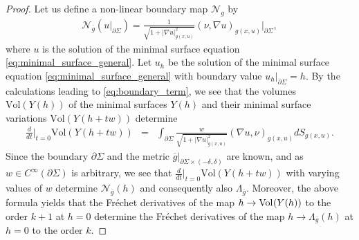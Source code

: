 \documentclass[12pt]{amsart}
\def\p{\partial}
\theoremstyle{definition}
\theoremstyle{remark}
\newcommand{\abs}[1]{\lvert #1 \rvert}
\newcommand{\s}{\hspace{0.5pt}}
\begin{document}
\begin{proof}

Let us define a non-linear boundary map $\mathcal{N}_g$ by
\begin{eqnarray*}
\mathcal{N}_{\overline g} (u|_{\p \Sigma})= \frac 1{\sqrt{1+\abs{\nabla u}^2_{g(x,u)}}}
 (\nu, \nabla u)_{g(x,u)}\bigg|_{\p \Sigma},
\end{eqnarray*}
where $u$ is the solution of the minimal surface equation \eqref{eq:minimal_surface_general}. Let $u_h$ be the solution of the minimal surface equation \eqref{eq:minimal_surface_general} with
boundary value  $u_h|_{\p\Sigma}=h$. By the calculations leading to \eqref{eq:boundary_term}, we see that 
%
the  volumes $ \text{Vol}(Y(h))$ of the minimal surfaces $Y(h)$
and their minimal surface variations $ \text{Vol}(Y(h+tw))$ determine
\begin{eqnarray*}
 \frac{d}{dt}\Big|_{t=0}\text{Vol}(Y(h+tw))
 &=&  \int_{\p \Sigma} \frac{w}{\sqrt{1+\abs{\nabla u}^2_{g(x,u)}}}(\nabla u, \nu)_{g(x,u)}dS_{g(x,u)}.
\end{eqnarray*}
Since the boundary $\p \Sigma$ and the metric $ \overline g|_{\p \Sigma\times (-\delta,\delta)}$ are known, and as $w\in C^\infty(\p \Sigma)$ is arbitrary, we see that $ \frac{d}{dt}\big|_{t=0}\text{Vol}(Y(h+tw))
$ with varying values of $w$ determine $\mathcal{N}_{\overline g} (h)$ and consequently also $\Lambda_{\overline g}$. Moreover, the above formula yields that the Fr\'echet derivatives of the map $h\to  \text{Vol}\s (Y(h))$ 
to the order $k+1$ at $h=0$  determine the  Fr\'echet derivatives of the map $h\to \Lambda_{\overline g}(h)$
at $h=0$ to the order $k$.
\end{proof}
\end{document}
